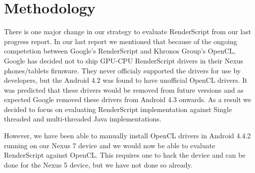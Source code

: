 \section*{Methodology}
There is one major change in our strategy to evaluate RenderScript from our last
progress report. In our last report we mentioned that because of the ongoing competetion between
Google's RenderScript and Khronos Group's OpenCL, Google has decided not to ship
GPU-CPU RenderScript drivers in their Nexus phones/tablets firmware. They never
officialy supported the drivers for use by developers, but the Android 4.2 was
found to have unofficial OpenCL drivers. It was predicted that these drivers
would be removed from future versions and as expected Google removed these drivers from
Android 4.3 onwards. As a result we decided to focus on evaluating RenderScript
implementation against Single threaded and multi-threaded Java implementations. 

However, we have been able to manually install OpenCL drivers in Android 4.4.2
running on our Nexus 7 device and we would now be able to evaluate
RenderScript against OpenCL.
This requires one to hack the device and can be done for the Nexus 5 device, but
  we have not done so already.
